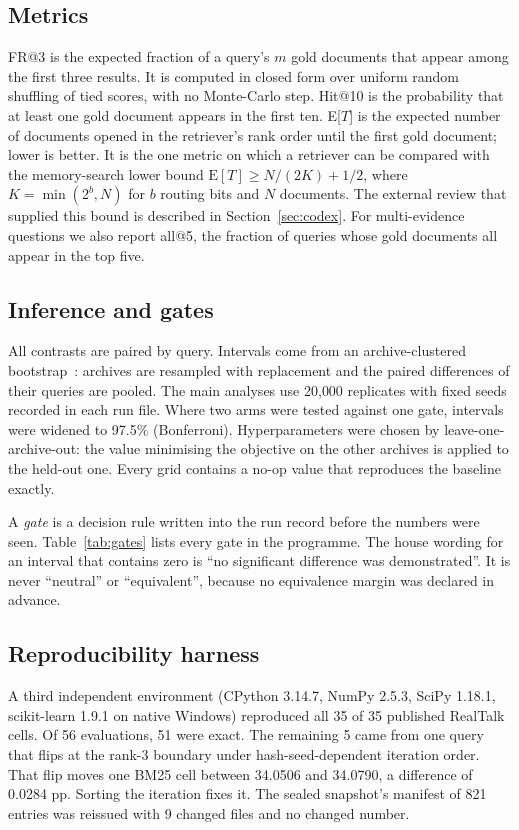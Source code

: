 \documentclass[11pt,a4paper]{article}
\makeatletter
\newcommand{\FR}{FR@3}
\newcommand{\ET}{E[$T$]}
\makeatother
\begin{document}
\subsection{Metrics}
\FR{} is the expected fraction of a query's $m$ gold documents that appear among the first three results. It is computed in closed form over uniform random shuffling of tied scores, with no Monte-Carlo step. Hit@10 is the probability that at least one gold document appears in the first ten. \ET{} is the expected number of documents opened in the retriever's rank order until the first gold document; lower is better. It is the one metric on which a retriever can be compared with the memory-search lower bound $\mathrm{E}[T]\ge N/(2K)+1/2$, where $K=\min(2^{b},N)$ for $b$ routing bits and $N$ documents. The external review that supplied this bound is described in Section~\ref{sec:codex}. For multi-evidence questions we also report all@5, the fraction of queries whose gold documents all appear in the top five.

\subsection{Inference and gates}
All contrasts are paired by query. Intervals come from an archive-clustered bootstrap~\citep{efron1979bootstrap}: archives are resampled with replacement and the paired differences of their queries are pooled. The main analyses use 20{,}000 replicates with fixed seeds recorded in each run file. Where two arms were tested against one gate, intervals were widened to 97.5\% (Bonferroni). Hyperparameters were chosen by leave-one-archive-out: the value minimising the objective on the other archives is applied to the held-out one. Every grid contains a no-op value that reproduces the baseline exactly.

A \emph{gate} is a decision rule written into the run record before the numbers were seen. Table~\ref{tab:gates} lists every gate in the programme. The house wording for an interval that contains zero is ``no significant difference was demonstrated''. It is never ``neutral'' or ``equivalent'', because no equivalence margin was declared in advance.



\subsection{Reproducibility harness}
A third independent environment (CPython 3.14.7, NumPy 2.5.3, SciPy 1.18.1, scikit-learn 1.9.1 on native Windows) reproduced all 35 of 35 published RealTalk cells. Of 56 evaluations, 51 were exact. The remaining 5 came from one query that flips at the rank-3 boundary under hash-seed-dependent iteration order. That flip moves one BM25 cell between 34.0506 and 34.0790, a difference of 0.0284 pp. Sorting the iteration fixes it. The sealed snapshot's manifest of 821 entries was reissued with 9 changed files and no changed number.
\end{document}
